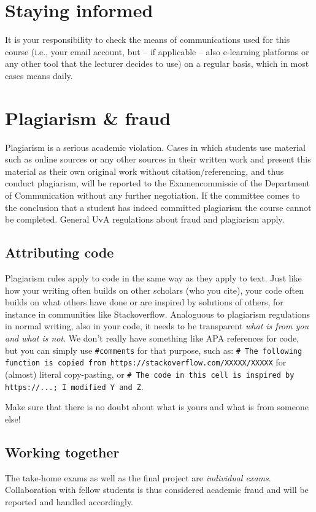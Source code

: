 \documentclass[a4paper,10pt,twocolumn]{report}
\begin{document}
\section{Staying informed}
It is your responsibility to check the means of communications used for this course (i.e., your email account, but -- if applicable -- also e-learning platforms or any other tool that the lecturer decides to use) on a regular basis, which in most cases means daily.

\section{Plagiarism \& fraud}
Plagiarism is a serious academic violation. Cases in which students use material such as online sources or any other sources in their written work and present this material as their own original work without citation/referencing, and thus conduct plagiarism, will be reported to the Examencommissie of the Department of Communication without any further negotiation. If the committee comes to the conclusion that a student has indeed committed plagiarism the course cannot be completed.
General UvA regulations about fraud and plagiarism apply.

\subsection{Attributing code}
Plagiarism rules apply to code in the same way as they apply to text. Just like how your writing often builds on other scholars (who you cite), your code often builds on what others have done or are inspired by solutions of others, for instance in communities like Stackoverflow. Analoguous to plagiarism regulations in normal writing, also in your code, it needs to be transparent \emph{what is from you and what is not}. We don't really have something like APA references for code, but you can simply use \texttt{\#comments} for that purpose, such as:
\texttt{\# The following function is copied from https://stackoverflow.com/XXXXX/XXXXX} for (almost) literal copy-pasting, or \texttt{\# The code in this cell is inspired by https://...; I modified Y and Z}. 

Make sure that there is no doubt about what is yours and what is from someone else!

\subsection{Working together}
The take-home exams as well as the final project are \emph{individual exams}. Collaboration with fellow students is thus considered academic fraud and will be reported and handled accordingly.
\end{document}
